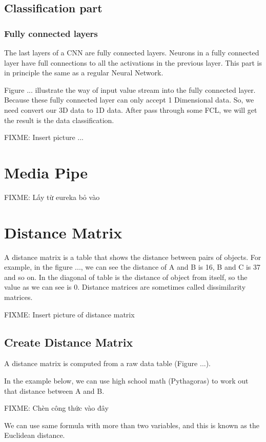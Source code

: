     \subsection{ Classification part }
      \subsubsection{ Fully connected layers }
        The last layers of a CNN are fully connected layers. Neurons in a 
        fully connected layer have full connections to all the activations in the previous 
        layer. This part is in principle the same as a regular Neural Network.

        Figure ... illustrate the way of input value stream into the fully connected layer.
        Because these fully connected layer can only accept 1 Dimensional data. So, we need convert our 3D
        data to 1D data. After pass through some FCL, we will get the result is the data
        classification.

        FIXME: Insert picture ...
  \section{ Media Pipe }
    FIXME: Lấy từ eureka bỏ vào


  \section{ Distance Matrix }
    A distance matrix is a table that shows the distance between pairs of objects.
    For example, in the figure ..., we can see the distance of A and B is 16, B and C is 37
    and so on. In the diagonal of table is the distance of object from itself, so the value
    as we can see is 0. Distance matrices are sometimes called dissimilarity matrices.

    FIXME: Insert picture of distance matrix

    \subsection{ Create Distance Matrix }
      A distance matrix is computed from a raw data table (Figure ...). 
      
      In the example below, we can use high school math (Pythagoras) to work out 
      that distance between A and B. 

      FIXME: Chèn công thức vào đây
      
      We can use same formula with more than two variables, and this is known as 
      the Euclidean distance.

